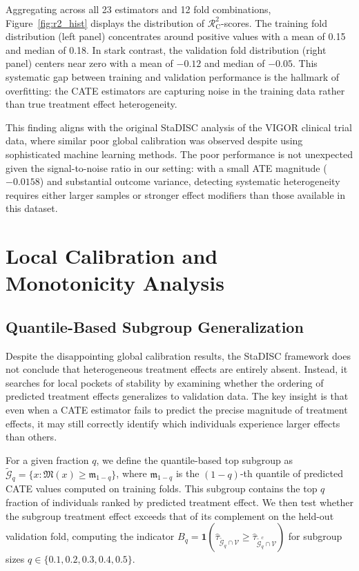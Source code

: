\documentclass[11pt,a4paper]{article}
\newcommand{\rsquare}{\ensuremath{\mathcal{R}^2_{\mathrm{C}}}}
\begin{document}
Aggregating across all 23 estimators and 12 fold combinations, Figure~\ref{fig:r2_hist} displays the distribution of $\rsquare$-scores. The training fold distribution (left panel) concentrates around positive values with a mean of 0.15 and median of 0.18. In stark contrast, the validation fold distribution (right panel) centers near zero with a mean of $-0.12$ and median of $-0.05$. This systematic gap between training and validation performance is the hallmark of overfitting: the CATE estimators are capturing noise in the training data rather than true treatment effect heterogeneity.

This finding aligns with the original StaDISC analysis of the VIGOR clinical trial data, where similar poor global calibration was observed despite using sophisticated machine learning methods. The poor performance is not unexpected given the signal-to-noise ratio in our setting: with a small ATE magnitude ($-0.0158$) and substantial outcome variance, detecting systematic heterogeneity requires either larger samples or stronger effect modifiers than those available in this dataset.

\section{Local Calibration and Monotonicity Analysis}

\subsection{Quantile-Based Subgroup Generalization}
Despite the disappointing global calibration results, the StaDISC framework does not conclude that heterogeneous treatment effects are entirely absent. Instead, it searches for local pockets of stability by examining whether the ordering of predicted treatment effects generalizes to validation data. The key insight is that even when a CATE estimator fails to predict the precise magnitude of treatment effects, it may still correctly identify which individuals experience larger effects than others.

For a given fraction $q$, we define the quantile-based top subgroup as $\widetilde{\mathcal{G}}_q = \{x : \mathfrak{M}(x) \geq \mathfrak{m}_{1-q}\}$, where $\mathfrak{m}_{1-q}$ is the $(1-q)$-th quantile of predicted CATE values computed on training folds. This subgroup contains the top $q$ fraction of individuals ranked by predicted treatment effect. We then test whether the subgroup treatment effect exceeds that of its complement on the held-out validation fold, computing the indicator $B_q = \mathbf{1}(\widehat{\tau}_{\widetilde{\mathcal{G}}_q \cap \mathcal{V}} \geq \widehat{\tau}_{\widetilde{\mathcal{G}}_q^c \cap \mathcal{V}})$ for subgroup sizes $q \in \{0.1, 0.2, 0.3, 0.4, 0.5\}$.
\end{document}
